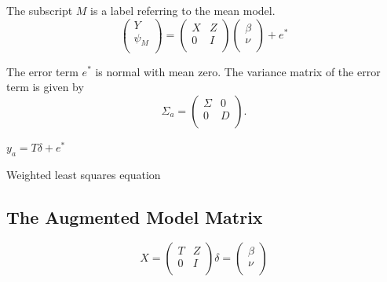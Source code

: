 \documentclass[12pt, a4paper]{report}
\theoremstyle{plain}
\theoremstyle{definition}
\theoremstyle{remark}
\begin{document}
	
	
	
	The subscript $M$ is a label referring to the mean model.
	\begin{equation}
	\left(%
	\begin{array}{c}
	Y \\
	\psi_{M} \\
	\end{array}%
	\right) = \left(
	\begin{array}{cc}
	X & Z \\
	0 & I \\
	\end{array}\right) \left(%
	\begin{array}{c}
	\beta \\
	\nu \\
	\end{array}%
	\right)+ e^{*}
	\end{equation}
	
	
	
	
	The error term $e^{*}$ is normal with mean zero. The variance matrix of the error term is given by
	\begin{equation}
	\Sigma_{a} = \left(%
	\begin{array}{cc}
	\Sigma & 0 \\
	0 & D \\
	\end{array}%
	\right).
	\end{equation}
	
	$y_{a} = T \delta + e^{*}$
	
	Weighted least squares equation
	
	
	
	
	\subsection{The Augmented Model Matrix}  %
	\begin{equation}
	X = \left(%
	\begin{array}{cc}
	T & Z \\
	0 & I \\
	\end{array}%
	\right)
	\delta = \left(%
	\begin{array}{c}
	\beta  \\
	\nu  \\
	\end{array}%
	\right)
	\end{equation}
	
\end{document}

